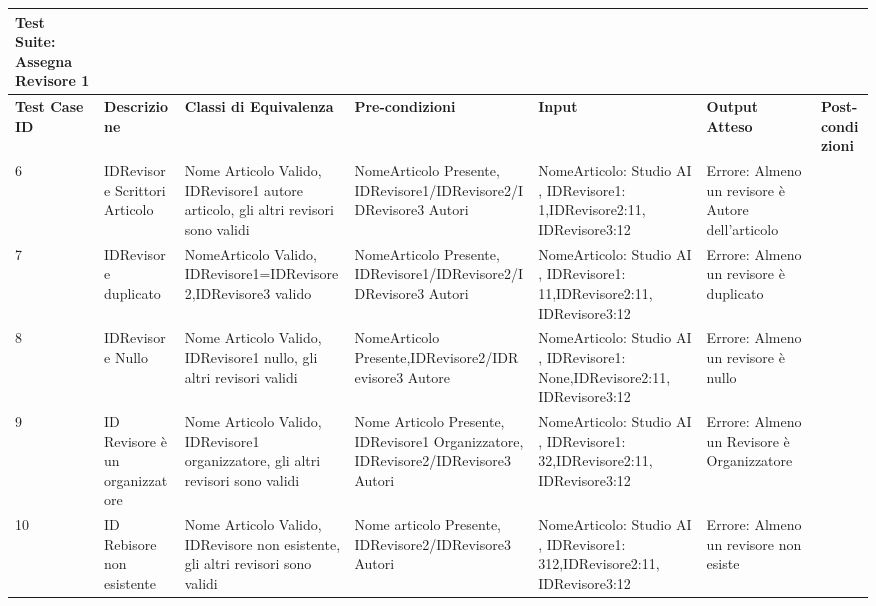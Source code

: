 \begin{sidewaystable}
\begin{tabular}{|p{3cm}|p{2cm}|p{2cm}|p{2cm}|p{4cm}|p{2cm}|p{2cm}|}
\hline
\rowcolor{SkyBlue}
\textbf{Test Suite: Assegna Revisore 1} & & & & & &\\
\hline
\rowcolor{Red}
\textbf{Test Case ID} & \textbf{Descrizione} & \textbf{Classi di Equivalenza} & \textbf{Pre-condizioni} & \textbf{Input} & \textbf{Output Atteso} & \textbf{Post-condizioni} \\
\hline
6&IDRevisore Scrittori Articolo& Nome Articolo Valido, IDRevisore1 autore articolo, gli altri revisori sono validi&NomeArticolo Presente, IDRevisore1/IDRevisore2/IDRevisore3 Autori&NomeArticolo: Studio AI , IDRevisore1: 1,IDRevisore2:11, IDRevisore3:12&Errore: Almeno un revisore è Autore dell'articolo &\\
\hline
7&IDRevisore duplicato& NomeArticolo Valido, IDRevisore1=IDRevisore2,IDRevisore3 valido &NomeArticolo Presente, IDRevisore1/IDRevisore2/IDRevisore3 Autori&NomeArticolo: Studio AI , IDRevisore1: 11,IDRevisore2:11, IDRevisore3:12&Errore: Almeno un revisore è duplicato &\\
\hline
8&IDRevisore Nullo& Nome Articolo Valido, IDRevisore1 nullo, gli altri revisori validi&NomeArticolo Presente,IDRevisore2/IDRevisore3 Autore& NomeArticolo: Studio AI , IDRevisore1: None,IDRevisore2:11, IDRevisore3:12& Errore: Almeno un revisore è nullo&\\
\hline
9&ID Revisore è un organizzatore&Nome Articolo Valido, IDRevisore1 organizzatore, gli altri revisori sono validi & Nome Articolo Presente, IDRevisore1 Organizzatore, IDRevisore2/IDRevisore3 Autori& NomeArticolo: Studio AI , IDRevisore1: 32,IDRevisore2:11, IDRevisore3:12&Errore: Almeno un Revisore è Organizzatore&\\
\hline
10&ID Rebisore non esistente&Nome Articolo Valido, IDRevisore non esistente, gli altri revisori sono validi & Nome articolo Presente, IDRevisore2/IDRevisore3 Autori&NomeArticolo: Studio AI , IDRevisore1: 312,IDRevisore2:11, IDRevisore3:12&Errore: Almeno un revisore non esiste&\\
\hline 
\end{tabular}
\end{sidewaystable}



